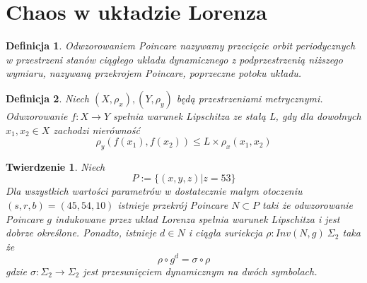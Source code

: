 \documentclass[12pt]{report}
\newtheorem{theorem}{Twierdzenie}
\newtheorem{definition}{Definicja}
\begin{document}
	\section{Chaos w układzie Lorenza}
	\begin{definition}
		Odwzorowaniem Poincare nazywamy przecięcie orbit periodycznych w przestrzeni stanów ciągłego układu dynamicznego z podprzestrzenią niższego wymiaru, nazywaną przekrojem Poincare, poprzeczne potoku układu.
	\end{definition}
	\begin{definition}
		Niech $(X, \rho_x), (Y, \rho_y)$ będą przestrzeniami metrycznymi. Odwzorowanie $f: X \to Y$ spełnia warunek Lipschitza ze stałą L, gdy dla dowolnych $x_1, x_2 \in X$ zachodzi nierówność
			\[ \rho_y(f(x_1), f(x_2)) \le L \times \rho_x(x_1, x_2) \]
	\end{definition}
	\begin{theorem}
		Niech
			\[ P := \{(x, y, z) | z = 53\} \]
		Dla wszystkich wartości parametrów w dostatecznie małym otoczeniu $(s, r, b) = (45, 54, 10)$ istnieje przekrój Poincare $N \subset P$ taki że odwzorowanie Poincare $g$ indukowane przez układ Lorenza spełnia warunek Lipschitza i jest dobrze określone. Ponadto, istnieje $d \in N$ i ciągła suriekcja $\rho : Inv(N, g) \ \Sigma_2$ taka że
			\[ \rho \circ g^d = \sigma \circ \rho \]
		gdzie $\sigma : \Sigma_2 \to \Sigma_2$ jest przesunięciem dynamicznym na dwóch symbolach. \cite{MM}
	\end{theorem}
\end{document}
